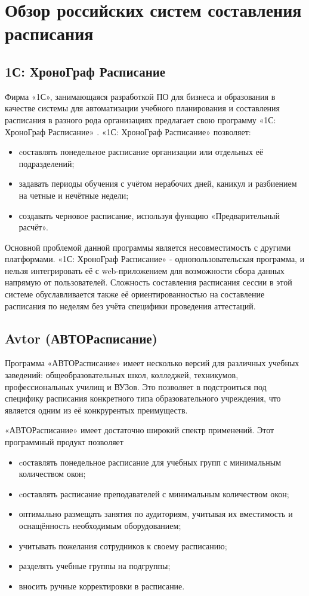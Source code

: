 \section{Обзор российских систем составления расписания} \label{ch1:sec2}

\subsection{1С: ХроноГраф Расписание} 
Фирма «1С», занимающаяся разработкой ПО для бизнеса и образования в качестве системы для автоматизации учебного планирования и составления расписания в разного рода организациях предлагает свою программу «1С: ХроноГраф Расписание» \cite{1с}.
«1С: ХроноГраф Расписание» позволяет:
\begin{itemize}
	\item cоставлять понедельное расписание организации или отдельных её подразделений;
	\item задавать периоды обучения с учётом нерабочих дней, каникул и разбиением на четные и нечётные недели;
	\item создавать черновое расписание, используя функцию «Предварительный расчёт».
\end{itemize}

Основной проблемой данной программы является несовместимость с другими платформами. «1С: ХроноГраф Расписание» - однопользовательская программа, и нельзя интегрировать её с web-приложением для возможности сбора данных напрямую от пользователей. Сложность составления расписания сессии в этой системе обуславливается также её ориентированностью на составление расписания по неделям без учёта специфики проведения аттестаций.

\subsection{Avtor (АВТОРасписание)} 
Программа «АВТОРасписание»  \cite{avtor} имеет несколько версий для различных учебных заведений: общеобразовательных школ, колледжей, техникумов, профессиональных училищ и ВУЗов. Это позволяет в подстроиться под специфику расписания конкретного типа образовательного учреждения, что является одним из её конкрурентых преимуществ.

«АВТОРасписание» имеет достаточно широкий спектр применений. Этот программный продукт позволяет
\begin{itemize}
	\item cоставлять понедельное расписание для учебных групп с минимальным количеством окон;
	\item cоставлять расписание преподавателей с минимальным количеством окон;
	\item оптимально размещать занятия по аудиториям, учитывая их вместимость и оснащённость необходимым оборудованием;
	\item учитывать пожелания сотрудников к своему расписанию;
	\item разделять учебные группы на подгруппы;
	\item вносить ручные корректировки в расписание.
\end{itemize}

